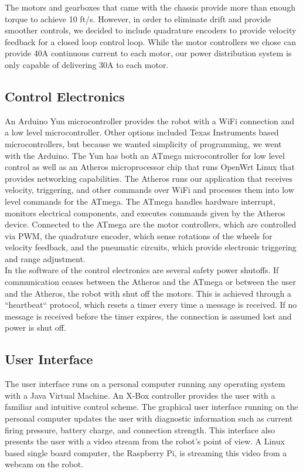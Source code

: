 \documentclass[letterpaper,12pt]{article}
\begin{document}
The motors and gearboxes that came with the chassis provide more than enough
torque to achieve 10 ft/s. However, in order to eliminate drift and provide
smoother controls, we decided to include quadrature encoders to provide
velocity feedback for a closed loop control loop. While the motor controllers
we chose can provide 40A continuous current to each motor, our power
distribution system is only capable of delivering 30A to each motor.\\

\subsection{Control Electronics}
An Arduino Yun microcontroller provides the robot with a WiFi
connection and a low level microcontroller. Other options included Texas
Instruments based microcontrollers, but because we wanted simplicity of
programming, we went with the Arduino. The Yun has both an ATmega
microcontroller for low level control as well as an Atheros microprocessor chip
that runs OpenWrt Linux that provides networking capabilities. The Atheros runs
our application that receives velocity, triggering, and other commands over
WiFi and processes them into low level commands for the ATmega. The ATmega
handles hardware interrupt, monitors electrical components, and executes
commands given by the Atheros device. Connected to the ATmega are the motor
controllers, which are controlled via PWM, the quadrature encoder, which sense
rotations of the wheels for velocity feedback, and the pneumatic circuits,
which provide electronic triggering and range adjustment.\\

In the software of the control electronics are several safety power shutoffs.
If communication ceases between the Atheros and the ATmega or between the user
and the Atheros, the robot with shut off the motors. This is achieved through
a “heartbeat“ protocol, which resets a timer every time a message is received.
If no message is received before the timer expires, the connection is assumed
lost and power is shut off.\\

\subsection{User Interface}
The user interface runs on a personal computer running any operating system
with a Java Virtual Machine. An X-Box controller provides the user with
a familiar and intuitive control scheme. The graphical user interface running
on the personal computer updates the user with diagnostic information such as
current firing pressure, battery charge, and connection strength. This
interface also presents the user with a video stream from the robot’s point of
view. A Linux based single board computer, the Raspberry Pi, is streaming this
video from a webcam on the robot.\\
\end{document}
